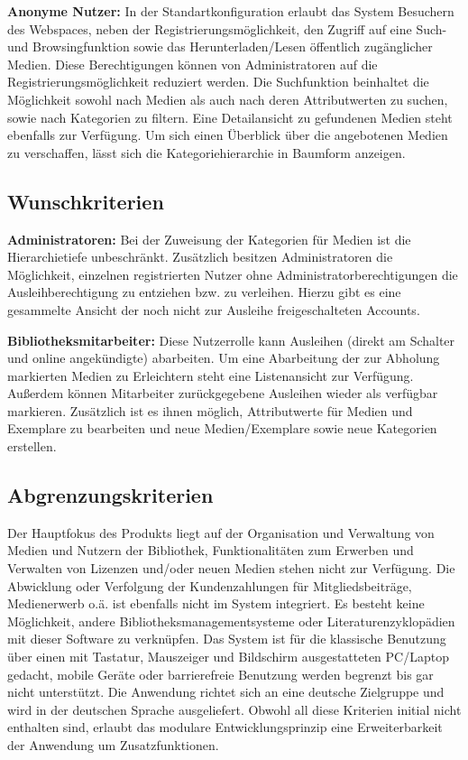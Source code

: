 \documentclass{article}
\begin{document}
\begin{flushleft}
\textbf{Anonyme Nutzer:} In der Standartkonfiguration erlaubt das System Besuchern des Webspaces, neben der Registrierungsmöglichkeit, den Zugriff auf eine Such- und Browsingfunktion sowie das Herunterladen/Lesen öffentlich zugänglicher Medien. Diese Berechtigungen können von Administratoren auf die Registrierungsmöglichkeit reduziert werden. Die Suchfunktion beinhaltet die Möglichkeit sowohl nach Medien als auch nach deren Attributwerten zu suchen, sowie nach Kategorien zu filtern. Eine Detailansicht zu gefundenen Medien steht ebenfalls zur Verfügung. Um sich einen Überblick über die angebotenen Medien zu verschaffen, lässt sich die Kategoriehierarchie in Baumform anzeigen.
\end{flushleft}
\subsection{Wunschkriterien}
\begin{flushleft}
\textbf{Administratoren:} Bei der Zuweisung der Kategorien für Medien ist die Hierarchietiefe unbeschränkt. Zusätzlich besitzen Administratoren die Möglichkeit, einzelnen registrierten Nutzer ohne Administratorberechtigungen die Ausleihberechtigung zu entziehen bzw. zu verleihen. Hierzu gibt es eine gesammelte Ansicht der noch nicht zur Ausleihe freigeschalteten  Accounts.
\end{flushleft}
\begin{flushleft}
\textbf{Bibliotheksmitarbeiter:} Diese Nutzerrolle kann Ausleihen (direkt am Schalter und online angekündigte) abarbeiten. Um eine Abarbeitung der zur Abholung markierten Medien zu Erleichtern steht eine Listenansicht zur Verfügung. Außerdem können Mitarbeiter zurückgegebene Ausleihen wieder als verfügbar markieren. Zusätzlich ist es ihnen möglich, Attributwerte für Medien und Exemplare zu bearbeiten und neue Medien/Exemplare sowie neue Kategorien erstellen.
\end{flushleft}
\subsection{Abgrenzungskriterien}
Der Hauptfokus des Produkts liegt auf der Organisation und Verwaltung von Medien und Nutzern der Bibliothek, Funktionalitäten zum Erwerben und Verwalten von Lizenzen und/oder neuen Medien stehen nicht zur Verfügung. Die Abwicklung oder Verfolgung der Kundenzahlungen für Mitgliedsbeiträge, Medienerwerb o.ä. ist ebenfalls nicht im System integriert. Es besteht keine Möglichkeit, andere Bibliotheksmanagementsysteme oder Literaturenzyklopädien mit dieser Software zu verknüpfen. Das System ist für die klassische Benutzung über einen mit Tastatur, Mauszeiger und Bildschirm ausgestatteten PC/Laptop gedacht, mobile Geräte oder barrierefreie Benutzung werden begrenzt bis gar nicht unterstützt. Die Anwendung richtet sich an eine deutsche Zielgruppe und wird in der deutschen Sprache ausgeliefert. Obwohl all diese Kriterien initial nicht enthalten sind, erlaubt das modulare Entwicklungsprinzip eine Erweiterbarkeit der Anwendung um Zusatzfunktionen.
\end{document}
